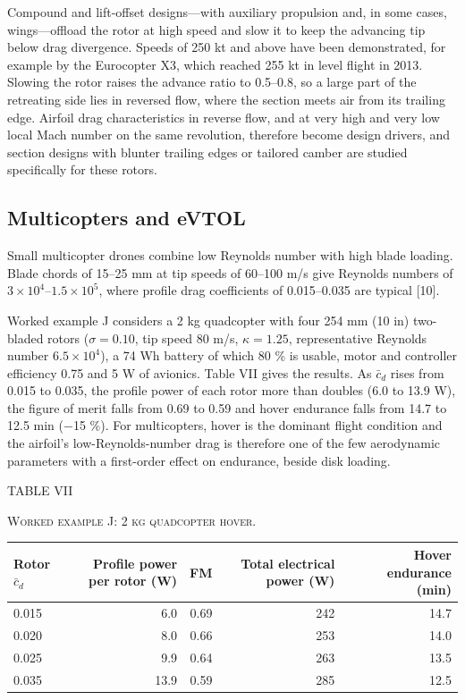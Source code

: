 \documentclass[10pt,a4paper,twocolumn]{article}
\begin{document}
Compound and lift-offset designs---with auxiliary propulsion and, in
some cases, wings---offload the rotor at high speed and slow it to keep
the advancing tip below drag divergence. Speeds of 250 kt and above have
been demonstrated, for example by the Eurocopter X3, which reached 255
kt in level flight in 2013. Slowing the rotor raises the advance ratio
to 0.5--0.8, so a large part of the retreating side lies in reversed
flow, where the section meets air from its trailing edge. Airfoil drag
characteristics in reverse flow, and at very high and very low local
Mach number on the same revolution, therefore become design drivers, and
section designs with blunter trailing edges or tailored camber are
studied specifically for these rotors.

\hypertarget{multicopters-and-evtol}{%
\subsection{Multicopters and eVTOL}\label{multicopters-and-evtol}}

Small multicopter drones combine low Reynolds number with high blade
loading. Blade chords of 15--25 mm at tip speeds of 60--100 m/s give
Reynolds numbers of \(3\times10^4\)--\(1.5\times10^5\), where profile
drag coefficients of 0.015--0.035 are typical {[}10{]}.

Worked example J considers a 2 kg quadcopter with four 254 mm (10 in)
two-bladed rotors (\(\sigma=0.10\), tip speed 80 m/s, \(\kappa=1.25\),
representative Reynolds number \(6.5\times10^4\)), a 74 Wh battery of
which 80 \% is usable, motor and controller efficiency 0.75 and 5 W of
avionics. Table VII gives the results. As \(\bar c_d\) rises from 0.015
to 0.035, the profile power of each rotor more than doubles (6.0 to 13.9
W), the figure of merit falls from 0.69 to 0.59 and hover endurance
falls from 14.7 to 12.5 min (−15 \%). For multicopters, hover is the
dominant flight condition and the airfoil's low-Reynolds-number drag is
therefore one of the few aerodynamic parameters with a first-order
effect on endurance, beside disk loading.

\begin{table}[!t]
\centering
{\footnotesize TABLE VII\par\textsc{Worked example J: 2 kg quadcopter hover.}\par}\vspace{4pt}
{\footnotesize\setlength{\tabcolsep}{4pt}\renewcommand{\arraystretch}{1.12}
\begin{tabular}{lrrrr}
\toprule
\textbf{Rotor \(\bar c_d\)} & \textbf{Profile power per rotor (W)} & \textbf{FM} & \textbf{Total electrical power (W)} & \textbf{Hover endurance (min)} \\
\midrule
0.015 & 6.0 & 0.69 & 242 & 14.7 \\
0.020 & 8.0 & 0.66 & 253 & 14.0 \\
0.025 & 9.9 & 0.64 & 263 & 13.5 \\
0.035 & 13.9 & 0.59 & 285 & 12.5 \\
\bottomrule
\end{tabular}
}
\end{table}
\end{document}
